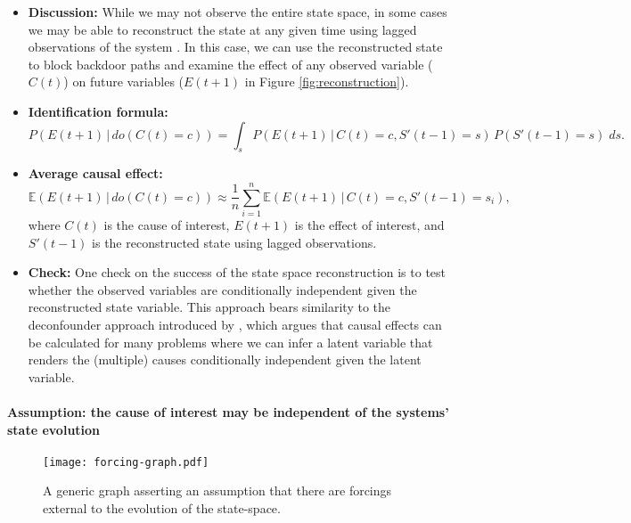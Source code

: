 \documentclass[12pt]{article}
\begin{document}
\begin{itemize}
\item \textbf{Discussion:} While we may not observe the entire state
  space, in some cases we may be able to reconstruct the state at any
  given time using lagged observations of the system \citep[see
  Takens' theorem,][]{takens1981detecting}. In this case, we can use
  the reconstructed state to block backdoor paths and examine the
  effect of any observed variable ($C(t)$) on future variables
  ($E(t+1)$ in Figure \ref{fig:reconstruction}).
\item \textbf{Identification formula:}
  \begin{equation*}
    P(E(t+1) \, | \, do(C(t) = c)) = \int_{s} P(E(t+1) \, | \, C(t) = c,
    S'(t-1) = s) \, P(S'(t-1)=s) \; d s.
  \end{equation*}
\item \textbf{Average causal effect:}
  \begin{equation*}
    \mathbb{E}(E(t+1) \, | \, do(C(t) = c)) \approx \frac{1}{n}
    \sum_{i=1}^n \mathbb{E}(E(t+1) \, | \, C(t)=c, S'(t-1)=s_i),
  \end{equation*}
  where $C(t)$ is the cause of interest, $E(t+1)$ is the effect of
  interest, and $S'(t-1)$ is the reconstructed state using lagged
  observations.
\item \textbf{Check:} One check on the success of the state space
  reconstruction is to test whether the observed variables are
  conditionally independent given the reconstructed state
  variable. This approach bears similarity to the deconfounder
  approach introduced by \cite{yixin-2019}, which argues that causal
  effects can be calculated for many problems where we can infer a
  latent variable that renders the (multiple) causes conditionally
  independent given the latent variable.
\end{itemize}

\newpage

\paragraph{Assumption: the cause of interest may be independent of the
  systems' state evolution}

\begin{figure} \texttt{[image: forcing-graph.pdf]}
  \caption{A generic graph asserting an assumption that there are
    forcings external to the evolution of the state-space.}
  \label{fig:forcing}
\end{figure}
\end{document}
